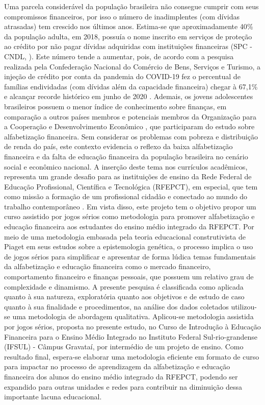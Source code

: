 Uma parcela considerável da população brasileira não consegue cumprir com seus compromissos financeiros, por isso o número de inadimplentes (com dívidas atrasadas) tem crescido nos últimos anos. Estima-se que aproximadamente 40{\%} da população adulta, em 2018, possuía o nome inscrito em serviços de proteção ao crédito por não pagar dívidas adquiridas com instituições financeiras (SPC - CNDL, \citeyear{spc2018}). Este número tende a aumentar, pois, de acordo com a pesquisa realizada pela Confederação Nacional do Comércio de Bens, Serviços e Turismo, a injeção de crédito por conta da pandemia do COVID-19 fez o percentual de famílias endividadas (com dívidas além da capacidade financeira) chegar à 67,1{\%} e alcançar recorde histórico em junho de 2020 \cite{cnc2020}. Ademais, os jovens adolescentes brasileiros possuem o menor índice de conhecimento sobre finanças, em comparação a outros países membros e potenciais membros da Organização para a Cooperação e Desenvolvimento Econômico \cite{oecd2017}, que participaram do estudo sobre alfabetização financeira. Sem considerar os problemas com pobreza e distribuição de renda do país, este contexto evidencia o reflexo da baixa alfabetização financeira e da falta de educação financeira da população brasileira no cenário social e econômico nacional. A inserção deste tema nos currículos acadêmicos, representa um grande desafio para as instituições de ensino da Rede Federal de Educação Profissional, Científica e Tecnológica (RFEPCT), em especial, que tem como missão a formação de um profissional cidadão e conectado ao mundo do trabalho contemporâneo \cite{brasil2008}. Em vista disso, este projeto tem o objetivo propor um curso assistido por jogos sérios como metodologia para promover alfabetização e educação financeira aos estudantes do ensino médio integrado da RFEPCT. Por meio de uma metodologia embasada pela teoria educacional construtivista de Piaget em seus estudos sobre a epistemologia genética, o processo implica o uso de jogos sérios para simplificar e apresentar de forma lúdica temas fundamentais da alfabetização e educação financeira como o mercado financeiro, comportamento financeiro e finanças pessoais, que possuem um relativo grau de complexidade e dinamismo. A presente pesquisa é classificada como aplicada quanto à sua natureza, exploratória quanto aos objetivos e de estudo de caso quanto à sua finalidade e procedimentos, na análise dos dados coletados utilizou-se uma metodologia de abordagem qualitativa. Aplicou-se metodologia assistida por jogos sérios, proposta no presente estudo, no Curso de Introdução à Educação Financeira para o Ensino Médio Integrado no Instituto Federal Sul-rio-grandense (IFSUL) - Câmpus Gravataí, por intermédio de um projeto de ensino. Como resultado final, espera-se elaborar uma metodologia eficiente em formato de curso para impactar no processo de aprendizagem da alfabetização e educação financeira dos alunos do ensino médio integrado da RFEPCT, podendo ser expandido para outras unidades e redes para contribuir na diminuição dessa importante lacuna educacional.